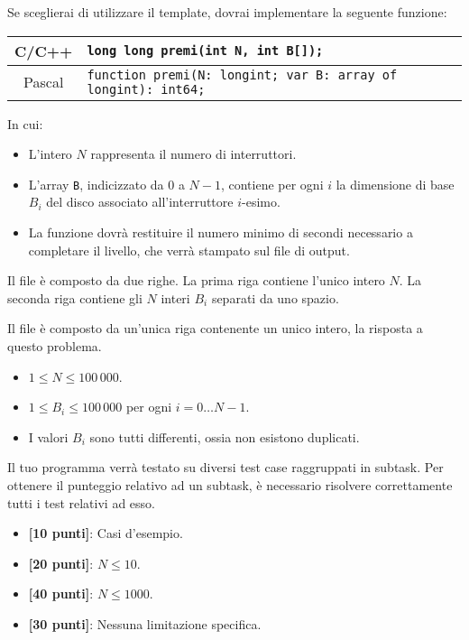 Se sceglierai di utilizzare il template, dovrai implementare la seguente funzione:
\begin{center}\begin{tabularx}{\textwidth}{|c|X|}
\hline
C/C++  & \verb|long long premi(int N, int B[]);|\\
\hline
Pascal & \verb|function premi(N: longint; var B: array of longint): int64;|\\
\hline
\end{tabularx}\end{center}
In cui:
\begin{itemize}[nolistsep]
  \item L'intero $N$ rappresenta il numero di interruttori.
  \item L'array \texttt{B}, indicizzato da $0$ a $N-1$, contiene per ogni $i$ la dimensione di base $B_i$ del disco associato all'interruttore $i$-esimo.
  \item La funzione dovrà restituire il numero minimo di secondi necessario a completare il livello, che verrà stampato sul file di output.
\end{itemize}

\InputFile
Il file  è composto da due righe. La prima riga contiene l'unico intero $N$. La seconda riga contiene gli $N$ interi $B_i$ separati da uno spazio.

\OutputFile
Il file \outputfile{} è composto da un'unica riga contenente un unico intero, la risposta a questo problema.

\Constraints
\begin{itemize}[nolistsep, itemsep=2mm]
	\item $1 \le N \le 100\,000$.
	\item $1 \le B_i \le 100\,000$ per ogni $i=0\ldots N-1$.
	\item I valori $B_i$ sono tutti differenti, ossia non esistono duplicati.
\end{itemize}

\Scoring
Il tuo programma verrà testato su diversi test case raggruppati in subtask.
Per ottenere il punteggio relativo ad un subtask, è necessario risolvere
correttamente tutti i test relativi ad esso.

\begin{itemize}[nolistsep,itemsep=2mm]
  \item \textbf{ [10 punti]}: Casi d'esempio.
  \item \textbf{ [20 punti]}: $N \leq 10$.
  \item \textbf{ [40 punti]}: $N \leq 1000$.
  \item \textbf{ [30 punti]}: Nessuna limitazione specifica.
\end{itemize}

